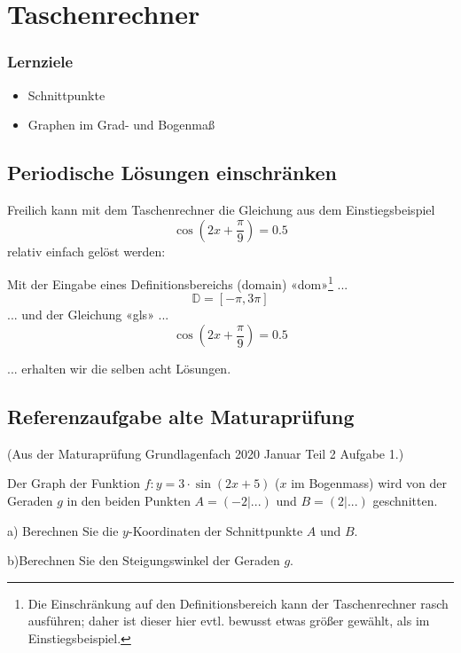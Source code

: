 
\section{Taschenrechner}

\subsubsection*{Lernziele}

\begin{itemize}
\item Schnittpunkte
\item Graphen im Grad- und Bogenmaß
\end{itemize}

\subsection{Periodische Lösungen einschränken}
Freilich kann mit dem Taschenrechner die Gleichung aus dem
Einstiegsbeispiel $$\cos\left(2x+\frac{\pi}{9}\right)=0.5$$ relativ einfach gelöst werden:

Mit der Eingabe eines Definitionsbereichs (domain) «dom»\footnote{Die Einschränkung auf den Definitionsbereich kann der Taschenrechner rasch ausführen; daher ist dieser hier evtl. bewusst etwas größer gewählt, als im Einstiegsbeispiel.}  ...
$$\mathbb{D} =  [ -\pi , 3\pi]$$
... und der Gleichung «gls» ...
$$\cos\left(2x+\frac{\pi}{9}\right) = 0.5$$

... erhalten wir die selben acht Lösungen.
    

\newpage


\subsection{Referenzaufgabe alte Maturaprüfung}
(Aus der Maturaprüfung Grundlagenfach 2020 Januar Teil 2 Aufgabe 1.)

Der Graph der Funktion $f: y=3\cdot{}\sin(2x+5)$ ($x$ im Bogenmass)  wird von der Geraden $g$ in den beiden Punkten $A=(-2|...)$ und $B=(2|...)$ geschnitten.

a) Berechnen Sie die $y$-Koordinaten der Schnittpunkte $A$ und $B$.

b)Berechnen Sie den Steigungswinkel der Geraden $g$.


